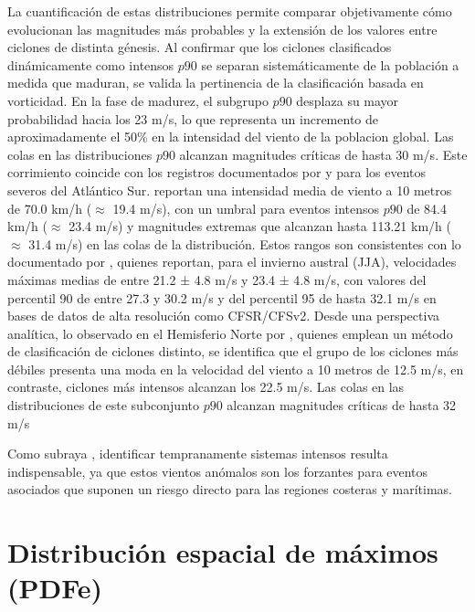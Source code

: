 La cuantificación de estas distribuciones permite comparar objetivamente cómo evolucionan las magnitudes más probables y la extensión de los valores entre ciclones de distinta génesis. 
Al confirmar que los ciclones clasificados dinámicamente como intensos $p90$ se separan sistemáticamente de la población a medida que maduran, se valida la pertinencia de la clasificación basada en vorticidad. 
En la fase de madurez, el subgrupo $p90$ desplaza su mayor probabilidad hacia los 23 m/s, lo que representa un incremento de aproximadamente el 50\% en la intensidad del viento de la poblacion global. 
Las colas en las distribuciones $p90$ alcanzan magnitudes críticas de hasta 30 m/s. Este corrimiento coincide con los registros documentados por \citet{padilhareinke2026characterization} y \citet{gramcianinov2020analysis} para los eventos severos del Atlántico Sur. 
\citet{padilhareinke2026characterization} reportan una intensidad media de viento a 10 metros de 70.0 km/h ($\approx$ 19.4 m/s), con un umbral para eventos intensos $p90$ de 84.4 km/h ($\approx$ 23.4 m/s) y magnitudes extremas que alcanzan hasta 113.21 km/h ($\approx$ 31.4 m/s) en las colas de la distribución. 
Estos rangos son consistentes con lo documentado por \citet{gramcianinov2020analysis}, quienes reportan, para el invierno austral (JJA), velocidades máximas medias de entre 21.2 ± 4.8 m/s y 23.4 ± 4.8 m/s, con valores del percentil 90 de entre 27.3 y 30.2 m/s y del percentil 95 de hasta 32.1 m/s en bases de datos de alta resolución como CFSR/CFSv2. 
Desde una perspectiva analítica, lo observado en el Hemisferio Norte por \citet{corner2025classification}, quienes emplean un método de clasificación de ciclones distinto, se identifica que el grupo de los ciclones más débiles presenta una moda en la velocidad del viento a 10 metros de 12.5 m/s, en contraste, ciclones más intensos alcanzan los 22.5 m/s. 
Las colas en las distribuciones de este subconjunto $p90$ alcanzan magnitudes críticas de hasta 32 m/s

Como subraya \citet{gramcianinov2023impact}, identificar tempranamente sistemas intensos resulta indispensable, ya que estos vientos anómalos son los forzantes para eventos asociados que suponen un riesgo directo para las regiones costeras y marítimas.


\section{Distribución espacial de máximos (PDFe)}

